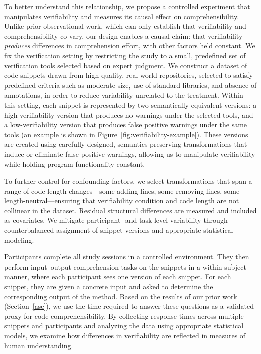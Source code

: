 To better understand this relationship, we propose a controlled experiment that manipulates verifiability and measures its causal effect on comprehensibility. Unlike prior observational work, which can only establish that verifiability and comprehensibility co-vary, our design enables a causal claim: that verifiability \emph{produces} differences in comprehension effort, with other factors held constant. We fix the verification setting by restricting the study to a small, predefined set of verification tools selected based on expert judgment. We construct a dataset of code snippets drawn from high-quality, real-world repositories, selected to satisfy predefined criteria such as moderate size, use of standard libraries, and absence of annotations, in order to reduce variability unrelated to the treatment. Within this setting, each snippet is represented by two semantically equivalent versions: a high-verifiability version that produces no warnings under the selected tools, and a low-verifiability version that produces false positive warnings under the same tools (an example is shown in Figure~\ref{fig:verifiability-example}). These versions are created using carefully designed, semantics-preserving transformations that induce or eliminate false positive warnings, allowing us to manipulate verifiability while holding program functionality constant.

To further control for confounding factors, we select transformations that span a range of code length changes---some adding lines, some removing lines, some length-neutral---ensuring that verifiability condition and code length are not collinear in the dataset. Residual structural differences are measured and included as covariates. We mitigate participant- and task-level variability through counterbalanced assignment of snippet versions and appropriate statistical modeling.

Participants complete all study sessions in a controlled environment. They then perform input–output comprehension tasks on the snippets in a within-subject manner, where each participant sees one version of each snippet. For each snippet, they are given a concrete input and asked to determine the corresponding output of the method. Based on the results of our prior work (Section~\ref{ase}), we use the time required to answer these questions as a validated proxy for code comprehensibility. By collecting response times across multiple snippets and participants and analyzing the data using appropriate statistical models, we examine how differences in verifiability are reflected in measures of human understanding.

